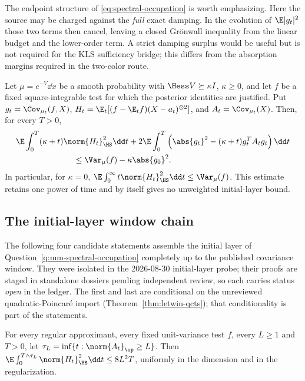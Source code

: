 \documentclass[../../main.tex]{subfiles}
\begin{document}
The endpoint structure of \eqref{eq:spectral-occupation} is worth emphasizing.  Here the source may be
charged against the \emph{full} exact damping.  In the evolution of $\E|g_t|^2$ those two terms
then cancel, leaving a closed Gr\"onwall inequality from the linear budget and the lower-order
term.  A strict damping surplus would be useful but is not required for the KLS sufficiency
bridge; this differs from the absorption margins required in the two-color route.

\begin{lemma}
\label{lem:mm-time-weighted-fixed-source}
Let $\mu=e^{-V}\dd x$ be a smooth probability with $\Hess V\succeq\kappa I$, $\kappa\ge0$, and
let $f$ be a fixed square-integrable test for which the posterior identities are justified.  Put
$g_t=\Cov_{\mu_t}(f,X)$, $H_t=\E_t[(f-\E_tf)(X-a_t)^{\otimes2}]$, and $A_t=\Cov_{\mu_t}(X)$.
Then, for every $T>0$,
\begin{align}
 &\E\int_0^T(\kappa+t)\norm{H_t}_{\HS}^2\dd t
 +2\E\int_0^T\left(\abs{g_t}^2-(\kappa+t)g_t^TA_tg_t\right)\dd t \notag\\
 &\hspace{7em}\le \Var_\mu(f)-\kappa\abs{g_0}^2.
 \label{eq:mm-time-weighted-fixed-source}
\end{align}
In particular, for $\kappa=0$,
$\E\int_0^\infty t\norm{H_t}_{\HS}^2\dd t\le\Var_\mu(f)$.
This estimate retains one power of time and by itself gives no unweighted initial-layer bound.
\end{lemma}

\subsection{The initial-layer window chain}
\label{subsec:spectral-window-chain}

The following four candidate statements assemble the initial layer of
Question~\ref{q:mm-spectral-occupation} completely up to the published covariance window. They
were isolated in the 2026-08-30 initial-layer probe; their proofs are staged in standalone
dossiers pending independent review, so each carries status \emph{open} in the ledger. The first
and last are conditional on the unreviewed quadratic-Poincar\'e import
(Theorem~\ref{thm:letwin-qcts}); that conditionality is part of the statements.

\begin{lemma}
\label{lem:mm-stopped-window-source}
For every regular approximant, every fixed unit-variance test $f$, every $L\ge1$ and $T>0$, let
$\tau_L=\inf\{t:\norm{A_t}_\op\ge L\}$. Then
$\E\int_0^{T\wedge\tau_L}\norm{H_t}_{\HS}^2\dd t\le 8L^2T$, uniformly in the dimension and in
the regularization.
\end{lemma}
\end{document}
